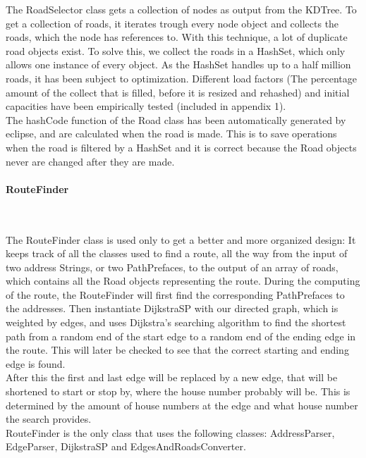 \documentclass[a4paper,10pt,titlepage]{article}
\begin{document}
The RoadSelector class gets a collection of nodes as output from the KDTree. To get a collection of roads, it iterates trough every node object and collects the roads, which the node has references to. With this technique, a lot of duplicate road objects exist. To solve this, we collect the roads in a HashSet, which only allows one instance of every object. As the HashSet handles up to a half million roads, it has been subject to optimization. Different load factors (The percentage amount of the collect that is filled, before it is resized and rehashed) and initial capacities have been empirically tested (included in appendix 1).\\

The hashCode function of the Road class has been automatically generated by eclipse, and are calculated when the road is made. This is to save operations when the road is filtered by a HashSet and it is correct because the Road objects never are changed after they are made.
				
				\paragraph{RouteFinder}\mbox{}\
				
The RouteFinder class is used only to get a better and more organized design: It keeps track of all the classes used to find a route, all the way from the input of two address Strings, or two PathPrefaces, to the output of an array of roads, which contains all the Road objects representing the route. During the computing of the route, the RouteFinder will first find the corresponding PathPrefaces to the addresses. Then instantiate DijkstraSP with our directed graph, which is weighted by edges, and uses Dijkstra’s searching algorithm to find the shortest path from a random end of the start edge to a random end of the ending edge in the route. This will later be checked to see that the correct starting and ending edge is found.\\
After this the first and last edge will be replaced by a new edge, that will be shortened to start or stop by, where the house number probably will be. This is determined by the amount of house numbers at the edge and what house number the search provides.\\
RouteFinder is the only class that uses the following classes: AddressParser,  EdgeParser, DijkstraSP and EdgesAndRoadsConverter.\\
\end{document}
